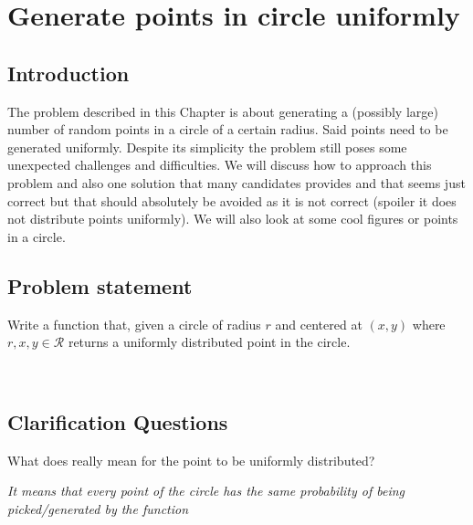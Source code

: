%

\chapter{Generate points in circle uniformly}
\label{ch:random_points_in_circle}
\section*{Introduction}
The problem described in this Chapter is about generating a (possibly large) number of random points in a circle of a certain radius. Said points need to be generated uniformly. Despite its simplicity the problem still poses some unexpected challenges and difficulties. We will discuss how to approach this problem and also one solution that many candidates provides and that seems just correct but that should absolutely be avoided as it is not correct (spoiler it does not distribute points uniformly). We will also look at some cool figures or points in a circle.

\section{Problem statement}
\begin{exercise}
Write a function that, given a circle of radius $r$ and centered at $(x,y)$ where $r,x,y \in \mathcal{R}$ returns a uniformly distributed point in the circle.
\end{exercise}



\begin{example}
	\hfill \\

	
\end{example}

\section{Clarification Questions}

\begin{QandA}
	\item What does really mean for the point to be uniformly distributed?
	\begin{answered}
		\textit{It means that every point of the circle has the same probability of being picked/generated by the function}
	\end{answered}
\end{QandA}

